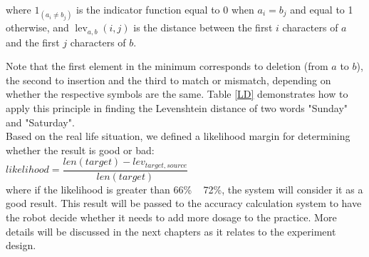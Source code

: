 \documentclass[conference]{IEEEtran}
\begin{document}
where ${\displaystyle 1_{(a_{i}\neq b_{j})}}$ is the indicator function equal to 0 when 
${\displaystyle a_{i}=b_{j}}$ and equal to 1 otherwise, and ${\displaystyle \operatorname {lev} _{a,b}(i,j)}$ 
is the distance between the first ${\displaystyle i}$ characters of ${\displaystyle a}$ and the
first ${\displaystyle j}$ characters of ${\displaystyle b}$.

Note that the first element in the minimum corresponds to deletion (from ${\displaystyle a}$ to 
${\displaystyle b}$), the second to insertion and the third to match or mismatch, depending on 
whether the respective symbols are the same. Table \ref{LD} demonstrates how to apply this
principle in finding the Levenshtein distance of two words "Sunday" and "Saturday".\\

Based on the real life situation, we defined a likelihood margin for determining whether the result
is good or bad: \\

${likelihood = \dfrac{len(target) - lev_{target,source}}{len(target)}}$\\

where if the likelihood is greater than 66\% ~ 72\%, the system will consider it as a good result.
This result will be passed to the accuracy calculation system to have the robot decide whether it
needs to add more dosage to the practice. More details will be discussed in the next chapters
as it relates to the experiment design.\\
\end{document}
